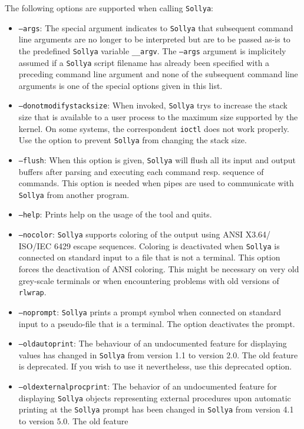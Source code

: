 \documentclass[a4paper]{article}
\newcommand{\sollya}{\texttt{Sollya}\xspace}
\begin{document}
The following options are supported when calling \sollya:
\begin{itemize}
\item \texttt{--args}: The special argument indicates to \sollya that subsequent
command line arguments are no longer to be interpreted but are to be passed as-is
to the predefined \sollya variable \texttt{\_\_argv}. The \texttt{--args} argument
is implicitely assumed if a \sollya script filename has already been specified with a 
preceding command line argument and none of the subsequent command line arguments 
is one of the special options given in this list.
\item \texttt{--donotmodifystacksize}: When invoked, \sollya trys to increase
the stack size that is available to a user process to the maximum size
supported by the kernel. On some systems, the correspondent \texttt{ioctl} 
does not work properly. Use the option to prevent \sollya from changing the 
stack size.
\item \texttt{--flush}: When this option is given, \sollya will flush
all its input and output buffers after parsing and executing each
command resp. sequence of commands. This option is needed when pipes
are used to communicate with \sollya from another program.
\item \texttt{--help}: Prints help on the usage of the tool and quits.
\item \texttt{--nocolor}: \sollya supports coloring of the output
  using ANSI X3.64/ ISO/IEC 6429 escape sequences. Coloring is
  deactivated when \sollya is connected on standard input to a file
  that is not a terminal. This option forces the deactivation of ANSI
  coloring. This might be necessary on very old grey-scale terminals or when
  encountering problems with old versions of \texttt{rlwrap}. 
\item \texttt{--noprompt}: \sollya prints a prompt symbol when
  connected on standard input to a pseudo-file that is a terminal. The
  option deactivates the prompt.
\item \texttt{--oldautoprint}: The behaviour of an undocumented
feature for displaying values has changed in \sollya from version 1.1
to version 2.0. The old feature is deprecated. If you wish to use it
nevertheless, use this deprecated option.
\item \texttt{--oldexternalprocprint}: The behavior of an undocumented
  feature for displaying \sollya objects representing external
  procedures upon automatic printing at the \sollya prompt has been
  changed in \sollya from version 4.1 to version 5.0. The old feature

\end{itemize}
\end{document}
